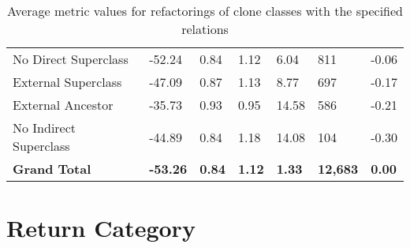 \begin{appendices}
\begin{table}[H]
{\begin{tabular}{@{}lllllll@{}}
\hspace{10pt} No Direct Superclass & -52.24 & 0.84 & 1.12 & 6.04 & 811 & -0.06 \\
\hspace{10pt} External Superclass & -47.09 & 0.87 & 1.13 & 8.77 & 697 & -0.17 \\
\hspace{10pt} External Ancestor & -35.73 & 0.93 & 0.95 & 14.58 & 586 & -0.21 \\
\hspace{10pt} No Indirect Superclass & -44.89 & 0.84 & 1.18 & 14.08 & 104 & -0.30 \\ \midrule
\textbf{Grand Total} & \textbf{-53.26} & \textbf{0.84} & \textbf{1.12} & \textbf{1.33} & \textbf{12,683} & \textbf{0.00} \\ \bottomrule
\end{tabular}%
}
\caption{Average metric values for refactorings of clone classes with the specified relations}
\label{tab:full-relation}
\end{table}

\section{Return Category}
\begin{table}[H]
\centering
{}
\caption{Average metric values for refactorings of clone classes with the specified return category}
\label{tab:full-return}
\end{table}


\end{appendices}
